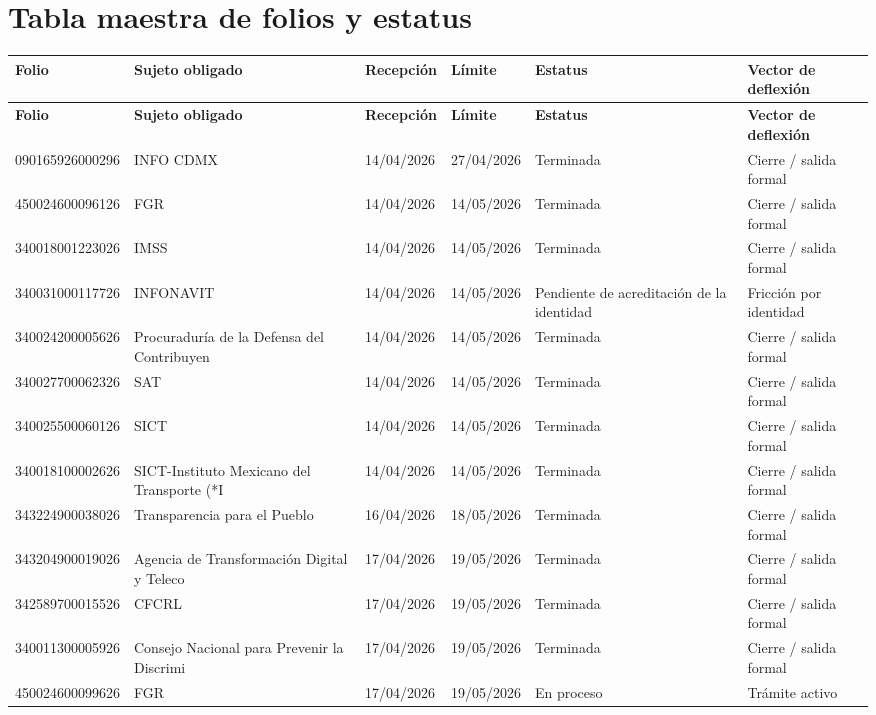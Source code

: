 \documentclass[10pt,letterpaper]{article}
\begin{document}
\section*{Tabla maestra de folios y estatus}
\small
\begin{longtable}{|p{3.0cm}|p{4.2cm}|p{2.2cm}|p{2.2cm}|p{3.8cm}|p{4.2cm}|}
\hline
\textbf{Folio} & \textbf{Sujeto obligado} & \textbf{Recepción} & \textbf{Límite} & \textbf{Estatus} & \textbf{Vector de deflexión}\\
\hline
\endfirsthead
\hline
\textbf{Folio} & \textbf{Sujeto obligado} & \textbf{Recepción} & \textbf{Límite} & \textbf{Estatus} & \textbf{Vector de deflexión}\\
\hline
\endhead
090165926000296 & INFO CDMX & 14/04/2026 & 27/04/2026 & Terminada & Cierre / salida formal \\ \hline
450024600096126 & FGR & 14/04/2026 & 14/05/2026 & Terminada & Cierre / salida formal \\ \hline
340018001223026 & IMSS & 14/04/2026 & 14/05/2026 & Terminada & Cierre / salida formal \\ \hline
340031000117726 & INFONAVIT & 14/04/2026 & 14/05/2026 & Pendiente de acreditación de la identidad & Fricción por identidad \\ \hline
340024200005626 & Procuraduría de la Defensa del Contribuyen & 14/04/2026 & 14/05/2026 & Terminada & Cierre / salida formal \\ \hline
340027700062326 & SAT & 14/04/2026 & 14/05/2026 & Terminada & Cierre / salida formal \\ \hline
340025500060126 & SICT & 14/04/2026 & 14/05/2026 & Terminada & Cierre / salida formal \\ \hline
340018100002626 & SICT-Instituto Mexicano del Transporte (*I & 14/04/2026 & 14/05/2026 & Terminada & Cierre / salida formal \\ \hline
343224900038026 & Transparencia para el Pueblo & 16/04/2026 & 18/05/2026 & Terminada & Cierre / salida formal \\ \hline
343204900019026 & Agencia de Transformación Digital y Teleco & 17/04/2026 & 19/05/2026 & Terminada & Cierre / salida formal \\ \hline
342589700015526 & CFCRL & 17/04/2026 & 19/05/2026 & Terminada & Cierre / salida formal \\ \hline
340011300005926 & Consejo Nacional para Prevenir la Discrimi & 17/04/2026 & 19/05/2026 & Terminada & Cierre / salida formal \\ \hline
450024600099626 & FGR & 17/04/2026 & 19/05/2026 & En proceso & Trámite activo \\ \hline

\end{longtable}
\end{document}
